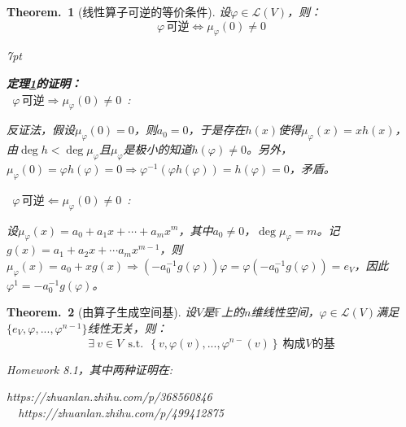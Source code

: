 \documentclass[zihao=5,UTF8]{report}
\theoremstyle{mystyle} %
\newtheorem{theorem}{Theorem.\,}
\newenvironment{graybox}{%
\def\FrameCommand{%
\hspace{1pt}%
{\color{gray}\small \vrule width 2pt}%
{\color{graybox_color}\vrule width 4pt}%
\colorbox{graybox_color}%
}%
\MakeFramed{\advance\hsize-\width\FrameRestore}%
\noindent\hspace{-4.55pt}%
\begin{adjustwidth}{}{7pt}%
\vspace{2pt}\vspace{2pt}%
}
{%
\vspace{2pt}\end{adjustwidth}\endMakeFramed%
}
\begin{document}
\begin{theorem}[线性算子可逆的等价条件]\label{线性算子可逆的等价条件}
设$\varphi \in \mathscr{L}(V)$，则：
\begin{equation*}
    \varphi\, \text{可逆} \Longleftrightarrow \mu_{\varphi}(0) \ne 0 
\end{equation*}

\begin{graybox}
\textbf{定理\ref{线性算子可逆的等价条件}的证明：}\\
\ $\varphi\, \text{可逆} \Longrightarrow \mu_{\varphi}(0) \ne 0$\ :\par
反证法，假设$\mu_{\varphi}(0) = 0$，则$a_0 = 0$，于是存在$h(x)$使得$\mu_{\varphi}(x) = xh(x)$，由$\deg h < \deg \mu_{\varphi}$且$\mu_{\varphi}$是极小的知道$h(\varphi) \ne 0$。另外，$\mu_{\varphi}(0) = \varphi h(\varphi) = 0 \Longrightarrow \varphi^{-1}(\varphi h(\varphi)) = h(\varphi) = 0$，矛盾。\par
\noindent{}\ $\varphi\, \text{可逆} \Longleftarrow\mu_{\varphi}(0) \ne 0$\ :\par
设$\mu_{\varphi}(x) = a_0 + a_1x + \cdots +a_mx^m$，其中$a_0 \ne 0$，$\deg \mu_{\varphi} = m$。记$g(x) = a_1 + a_2x + \cdots a_mx^{m-1}$，则$\mu_{\varphi}(x) = a_0 + xg(x) \Longrightarrow (-a_0^{-1}g(\varphi))\varphi = \varphi(-a_0^{-1}g(\varphi)) = e_V$，因此$\varphi^{1} = -a_0^{-1}g(\varphi)$。
\end{graybox}
\end{theorem}

\begin{theorem}[由算子生成空间基]\label{由算子生成空间基}
设$V$是$\mathbb{F}$上的$n$维线性空间，$\varphi \in \mathscr{L}(V)$满足$\{e_V,\varphi,...,\varphi^{n-1}\}$线性无关，则：
\begin{equation*}
    \exists\ v \in V\ \ \text{s.t.}\ \ \left\{v,\varphi(v),...,\varphi^{n-}(v) \right\}\ \text{构成$V$的基}
\end{equation*}
{\par\color{gray}\small
Homework 8.1，其中两种证明在:\par
https://zhuanlan.zhihu.com/p/368560846 \ \ 
https://zhuanlan.zhihu.com/p/499412875
\par}
\end{theorem}
\end{document}
